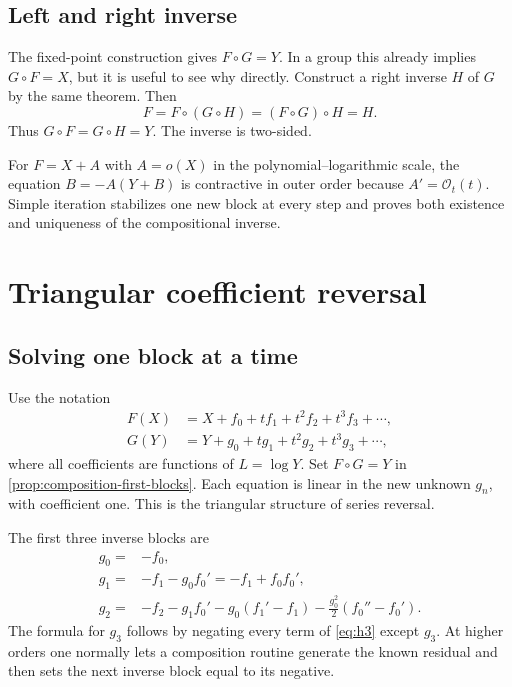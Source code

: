 \documentclass[11pt,oneside]{book}
\theoremstyle{definition}
\theoremstyle{remark}
\newcommand{\bigO}{\mathcal O}
\newcommand{\compose}{\mathbin{\circ}}
\begin{document}
\section{Left and right inverse}
The fixed-point construction gives $F\compose G=Y$.  In a group this already
implies $G\compose F=X$, but it is useful to see why directly.  Construct a
right inverse $H$ of $G$ by the same theorem.  Then
\[
 F=F\compose(G\compose H)=(F\compose G)\compose H=H.
\]
Thus $G\compose F=G\compose H=Y$.  The inverse is two-sided.

\begin{summarybox}
For $F=X+A$ with $A=o(X)$ in the polynomial--logarithmic scale, the equation
$B=-A(Y+B)$ is contractive in outer order because $A'=\bigO_t(t)$.  Simple
iteration stabilizes one new block at every step and proves both existence and
uniqueness of the compositional inverse.
\end{summarybox}


\chapter{Triangular coefficient reversal}
\label{ch:reversion-triangular}

\section{Solving one block at a time}
Use the notation
\begin{align*}
 F(X)&=X+f_0+t f_1+t^2f_2+t^3f_3+\cdots,\\
 G(Y)&=Y+g_0+t g_1+t^2g_2+t^3g_3+\cdots,
\end{align*}
where all coefficients are functions of $L=\log Y$.  Set $F\compose G=Y$ in
\cref{prop:composition-first-blocks}.  Each equation is linear in the new
unknown $g_n$, with coefficient one.  This is the triangular structure of
series reversal.

The first three inverse blocks are
\begin{align}
 g_0={}&-f_0,\label{eq:inverse-g0}\\
 g_1={}&-f_1-g_0f_0'= -f_1+f_0f_0',\label{eq:inverse-g1}\\
 g_2={}&-f_2-g_1f_0'-g_0(f_1'-f_1)
 -\frac{g_0^2}{2}(f_0''-f_0').
 \label{eq:inverse-g2}
\end{align}
The formula for $g_3$ follows by negating every term of \eqref{eq:h3} except
$g_3$.  At higher orders one normally lets a composition routine generate the
known residual and then sets the next inverse block equal to its negative.
\end{document}
